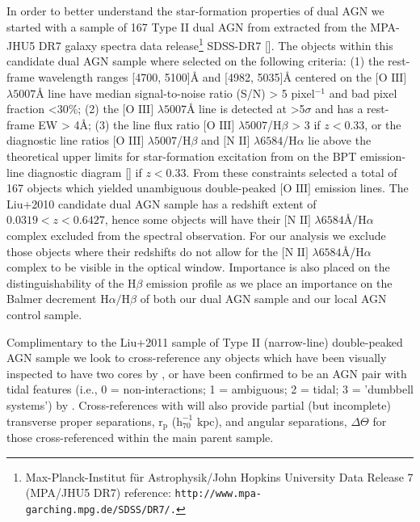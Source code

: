 In order to better understand the star-formation properties of dual AGN we started with a sample of 167 Type II dual AGN from \cite{Liu_2009} extracted from the MPA-JHU5 DR7 galaxy spectra data release\footnote{\tiny{Max-Planck-Institut für Astrophysik/John Hopkins University Data Release 7 (MPA/JHU5 DR7) reference: \tt{http://www.mpa-garching.mpg.de/SDSS/DR7/}.}} SDSS-DR7 [\cite{2009ApJS..182..543A}]. The objects within this candidate dual AGN sample where selected on the following criteria: (1) the rest-frame wavelength ranges [4700, 5100]$Å$ and [4982, 5035]$Å$ centered on the $\text{[O III]}$ $\lambda$$5007Å$ line have median signal-to-noise ratio (S/N) > 5 pixel$^{−1}$ and bad pixel fraction <30\%; (2) the $\text{[O III]}$ $\lambda$$5007Å$ line is detected at >5$\sigma$ and has a rest-frame EW > 4$Å$; (3) the line flux ratio $\text{[O III]}$ $\lambda$$5007$/$\text{H}\beta$ > 3 if ${z}<{0.33}$, or the diagnostic line ratios $\text{[O III]}$ $\lambda$$5007$/$\text{H}\beta$ and $\text{[N II]}$ $\lambda$$6584$/$\text{H}\alpha$ lie above the theoretical upper limits for star-formation excitation from \cite{Kewley_Dopita_Sutherland_Heisler_Trevena_2001} on the BPT emission-line diagnostic diagram [\cite{Baldwin_1981}] if ${z}<{0.33}$. From these constraints \cite{Liu_2009} selected a total of 167 objects which yielded unambiguous double-peaked $\text{[O III]}$ emission lines. The Liu+2010 candidate dual AGN sample has a redshift extent of ${0.0319}<{z}<{0.6427}$, hence some objects will have their $\text{[N II]}$ $\lambda$$6584Å$/$\text{H}\alpha$ complex excluded from the spectral observation. For our analysis we exclude those objects where their redshifts do not allow for the $\text{[N II]}$ $\lambda$$6584Å$/$\text{H}\alpha$ complex to be visible in the optical window. Importance is also placed on the distinguishability of the $\text{H}\beta$ emission profile as we place an importance on the Balmer decrement $\text{H}\alpha/\text{H}\beta$ of both our dual AGN sample and our local AGN control sample.

Complimentary to the Liu+2011 sample of Type II (narrow-line) double-peaked AGN sample we look to cross-reference any objects which have been visually inspected to have two cores by \cite{Ge_Hu_Wang_Bai_Zhang_2012}, or have been confirmed to be an AGN pair with tidal features (i.e., 0 = non-interactions; 1 = ambiguous; 2 = tidal; 3 = 'dumbbell systems') by \cite{Liu_2012}. Cross-references with \cite{Liu_2012} will also provide partial (but incomplete) transverse proper separations, $\text{r}_{\text{p}}$ ($\text{h}_{70}^{-1}$ $\text{kpc}$), and angular separations, $\Delta\Theta$ for those cross-referenced within the main parent sample.

